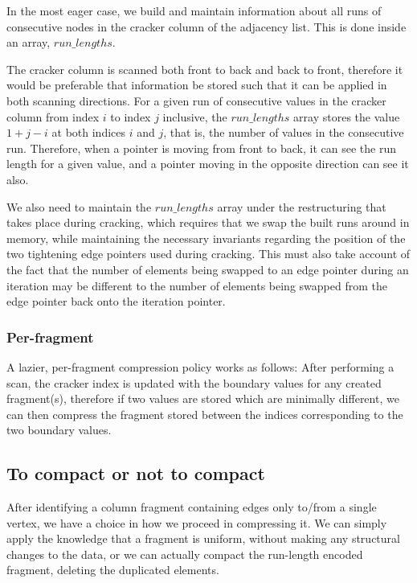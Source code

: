 In the most eager case, we build and maintain information about all runs of consecutive nodes in the
cracker column of the adjacency list. This is done inside an array, $run\_lengths$.

The cracker column is scanned both front to back and back to front, therefore it would be preferable
that information be stored such that it can be applied in both scanning directions. For a given run of
consecutive values in the cracker column from index $i$ to index $j$ inclusive, the $run\_lengths$
array stores the value $1 + j - i$ at both indices $i$ and $j$, that is, the number of values in the
consecutive run. Therefore, when a pointer is moving from front to back, it can see the run length for
a given value, and a pointer moving in the opposite direction can see it also.

We also need to maintain the $run\_lengths$ array under the restructuring that takes place during
cracking, which requires that we swap the built runs around in memory, while maintaining the
necessary invariants regarding the position of the two tightening edge pointers used during cracking.
This must also take account of the fact that the number of elements being swapped to an edge
pointer during an iteration may be different to the number of elements being swapped from the edge
pointer back onto the iteration pointer.

\subsubsection{Per-fragment}

A lazier, per-fragment compression policy works as follows: After performing a scan, the cracker
index is updated with the boundary values for any created fragment(s), therefore if two values are
stored which are minimally different, we can then compress the fragment stored between the indices
corresponding to the two boundary values.

\subsection{To compact or not to compact}

After identifying a column fragment containing edges only to/from a single vertex, we have a choice 
in how we proceed in compressing it. We can simply apply the knowledge that a fragment is uniform,
without making any structural changes to the data, or we can actually compact the run-length
encoded fragment, deleting the duplicated elements.

